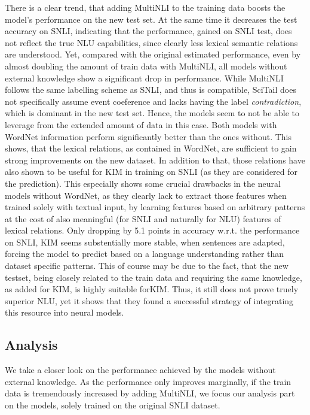 There is a clear trend, that adding \ac{MultiNLI} to the training data boosts the model's performance on the new test set. At the same time it decreases the test accuracy on SNLI, indicating that the performance, gained on \ac{SNLI} test, does not reflect the true \ac{NLU} capabilities, since clearly less lexical semantic relations are understood. Yet, compared with the original estimated performance, even by almost doubling the amount of train data with \ac{MultiNLI}, all models without external knowledge show a significant drop in performance. While MultiNLI follows the same labelling scheme as SNLI, and thus is compatible, SciTail does not specifically assume event coeference and lacks having the label \textit{contradiction}, which is dominant in the new test set. Hence, the models seem to not be able to leverage from the extended amount of data in this case. Both models with WordNet information perform significantly better than the ones without. This shows, that the lexical relations, as contained in WordNet, are sufficient to gain strong improvements on the new dataset. In addition to that, those relations have also shown to be useful for \ac{KIM} in training on \ac{SNLI} (as they are considered for the prediction). This especially shows some crucial drawbacks in the neural models without WordNet, as they clearly lack to extract those features when trained solely with textual input, by learning features based on arbitrary patterns at the cost of also meaningful (for \ac{SNLI} and naturally for \ac{NLU}) features of lexical relations. Only dropping by 5.1 points in accuracy w.r.t. the performance on \ac{SNLI}, \ac{KIM} seems substentially more stable, when sentences are adapted, forcing the model to predict based on a language understanding rather than dataset specific patterns. This of course may be due to the fact, that the new testset, being closely related to the train data and requiring the same knowledge, as added for \ac{KIM}, is highly suitable for\ac{KIM}. Thus, it still does not prove truely superior \ac{NLU}, yet it shows that they found a successful strategy of integrating this resource into neural models.

\subsection{Analysis}
We take a closer look on the performance achieved by the models without external knowledge. As the performance only improves marginally, if the train data is tremendously increased by adding \ac{MultiNLI}, we focus our analysis part on the models, solely trained on the original \ac{SNLI} dataset.
